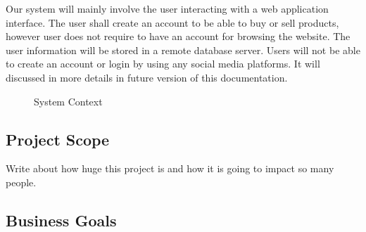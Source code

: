 \documentclass[11pt]{article}
\newcounter{use case ID}
\newcounter{req ID}
\begin{document}
Our system will mainly involve the user interacting with a web application interface. The user shall create an account to be able to buy or sell products, however user does not require to have an account for browsing the website. The user information will be stored in a remote database server. Users will not be able to create an account or login by using any social media platforms. It will discussed in more details in future version of this documentation. 

\clearpage

\begin{figure}[htbp]
    \caption{System Context}
    \label{fig:system-context}
\end{figure}

\subsection{Project Scope}
Write about how huge this project is and how it is going to impact so many people.
\clearpage

\subsection{Business Goals}
\end{document}
